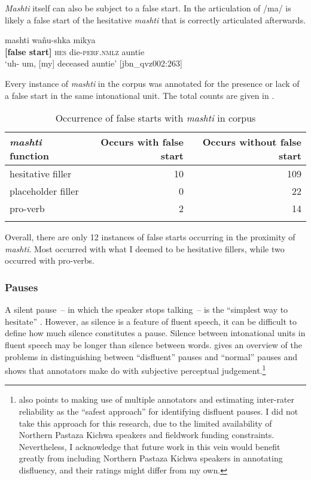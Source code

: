 \documentclass[output=paper]{langscibook}
\begin{document}
\textit{Mashti} itself can also be subject to a false start. In  the articulation of /ma/ is likely a false start of the hesitative \textit{mashti} that is correctly articulated afterwards.

\ea%
\label{ex:rice:23}
 {mashti} {wañu-shka} {mikya}\\
{\textbf{[false start]}} {\textsc{hes}} {die-\textsc{perf.nmlz}} {auntie}\\
\glt ‘uh- um, [my] deceased auntie’ [jbn\_qvz002:263]
    \z


Every instance of \textit{mashti} in the corpus was annotated for the presence or lack of a false start in the same intonational unit. The total counts are given in .


\begin{table}
\begin{tabular}{lrr}
\lsptoprule
\textit{mashti} function & Occurs with false start & Occurs without false start\\
\midrule
hesitative filler & 10 & 109\\
placeholder filler & 0 & 22\\
pro-verb & 2 & 14\\
\lspbottomrule
\end{tabular}
\caption{\label{tab:rice:7}Occurrence of false starts with \textit{mashti} in corpus}
\end{table}

Overall, there are only 12 instances of false starts occurring in the proximity of \textit{mashti}. Most occurred with what I deemed to be hesitative fillers, while two occurred with pro-verbs.

\subsubsection{Pauses}
\label{sec:rice:4.1.2}
A silent pause~-- in which the speaker stops talking~-- is the “simplest way to hesitate” \citep[456]{Lickley2015}. However, as silence is a feature of fluent speech, it can be difficult to define how much silence constitutes a pause. Silence between intonational units in fluent speech may be longer than silence between words. \citet[456–457]{Lickley2015} gives an overview of the problems in distinguishing between “disfluent” pauses and “normal” pauses and shows that annotators make do with subjective perceptual judgement.\footnote{\citet[457]{Lickley2015} also points to making use of multiple annotators and estimating inter-rater reliability as the “safest approach” for identifying disfluent pauses. I did not take this approach for this research, due to the limited availability of Northern Pastaza Kichwa speakers and fieldwork funding constraints. Nevertheless, I acknowledge that future work in this vein would benefit greatly from including Northern Pastaza Kichwa speakers in annotating disfluency, and their ratings might differ from my own.} 
\end{document}
